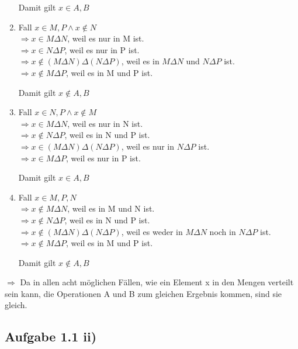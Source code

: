 \documentclass{article}
\begin{document}
\begin{enumerate}
            Damit gilt \(x \in A, B \) 

            \item Fall \(x \in M, P \land x \notin N \) \\
            \(\Rightarrow x \in M \Delta N \), weil es nur in M ist. \\
            \(\Rightarrow x \in N \Delta P \), weil es nur in P ist. \\
            \(\Rightarrow x \notin ( M \Delta N )\Delta(N \Delta P ) \), weil es in \(M \Delta N\) und \(N \Delta P\) ist. \\
            \(\Rightarrow x \notin M \Delta P \), weil es in M und P ist.

            Damit gilt \(x \notin A, B \) 
            
            \item Fall \(x \in N, P \land x \notin M \) \\
            \(\Rightarrow x \in M \Delta N \), weil es nur in N ist. \\
            \(\Rightarrow x \notin N \Delta P \), weil es in N und P ist. \\
            \(\Rightarrow x \in ( M \Delta N )\Delta(N \Delta P ) \), weil es nur in \(N \Delta P\) ist. \\
            \(\Rightarrow x \in M \Delta P \), weil es nur in P ist.

            Damit gilt \(x \in A, B \)

            \item Fall \(x \in M, P, N \) \\
            \(\Rightarrow x \notin M \Delta N \), weil es in M und N ist. \\
            \(\Rightarrow x \notin N \Delta P \), weil es in N und P ist. \\
            \(\Rightarrow x \notin ( M \Delta N )\Delta(N \Delta P ) \), weil es weder in \(M \Delta N\) noch in \(N \Delta P\) ist. \\
            \(\Rightarrow x \notin M \Delta P \), weil es in M und P ist.

            Damit gilt \(x \notin A, B \) 
        \end{enumerate}

        \( \Rightarrow \) Da in allen acht möglichen Fällen, wie ein Element x
        in den Mengen verteilt sein kann, die Operationen A und B zum gleichen Ergebnis kommen, sind sie gleich.


        \subsection*{Aufgabe 1.1 ii)}
            \newtheorem{thm}{Theorem}
            \newtheorem{lemma}[thm]{Lemma}
\end{document}

